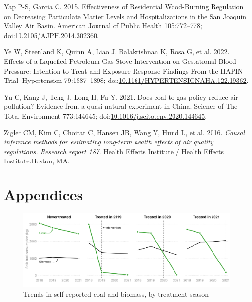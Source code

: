 \documentclass[
  letterpaper,
  DIV=11,
  numbers=noendperiod]{scrartcl}
\newlength{\cslhangindent}
\newlength{\cslentryspacingunit} %
\newenvironment{CSLReferences}[2] %
 {%
  \setlength{\parindent}{0pt}
  \ifodd #1
  \let\oldpar\par
  \def\par{\hangindent=\cslhangindent\oldpar}
  \fi
  \setlength{\parskip}{#2\cslentryspacingunit}
 }%
 {}
\begin{document}
\begin{CSLReferences}{1}{0}
\leavevmode{}%
Yap P-S, Garcia C. 2015. Effectiveness of {Residential Wood-Burning
Regulation} on {Decreasing Particulate Matter Levels} and
{Hospitalizations} in the {San Joaquin Valley Air Basin}. American
Journal of Public Health 105:772--778;
doi:\href{https://doi.org/10.2105/AJPH.2014.302360}{10.2105/AJPH.2014.302360}.

\leavevmode{}%
Ye W, Steenland K, Quinn A, Liao J, Balakrishnan K, Rosa G, et al. 2022.
Effects of a {Liquefied Petroleum Gas Stove Intervention} on
{Gestational Blood Pressure}: {Intention-to-Treat} and
{Exposure-Response Findings From} the {HAPIN Trial}. Hypertension
79:1887--1898;
doi:\href{https://doi.org/10.1161/HYPERTENSIONAHA.122.19362}{10.1161/HYPERTENSIONAHA.122.19362}.

\leavevmode{}%
Yu C, Kang J, Teng J, Long H, Fu Y. 2021. Does coal-to-gas policy reduce
air pollution? {Evidence} from a quasi-natural experiment in {China}.
Science of The Total Environment 773:144645;
doi:\href{https://doi.org/10.1016/j.scitotenv.2020.144645}{10.1016/j.scitotenv.2020.144645}.

\leavevmode{}%
Zigler CM, Kim C, Choirat C, Hansen JB, Wang Y, Hund L, et al. 2016.
\emph{Causal inference methods for estimating long-term health effects
of air quality regulations. {Research} report 187.} Health Effects
Institute / Health Effects Institute:Boston, MA.

\end{CSLReferences}

\newpage
\appendix
\renewcommand{\thefigure}{A\arabic{figure}}
\renewcommand{\thetable}{A\arabic{table}}
\setcounter{figure}{0}
\setcounter{table}{0}

\hypertarget{appendices}{%
\section{Appendices}\label{appendices}}

\begin{figure}[H]

{\centering \includegraphics[width=1\textwidth,height=\textheight]{images/coal-plot.png}

}

\caption{\label{fig-afig-coal}Trends in self-reported coal and biomass,
by treatment season}

\end{figure}
\end{document}
